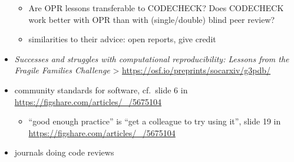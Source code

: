 \documentclass[12pt]{article}
\begin{document}
\begin{itemize}
  \begin{itemize}
  \item
    Are OPR lessons transferable to CODECHECK? Does CODECHECK work
    better with OPR than with (single/double) blind peer review?
  \item
    similarities to their advice: open reports, give credit
  \end{itemize}
\item
  \emph{Successes and struggles with computational reproducibility:
  Lessons from the Fragile Families Challenge} \textgreater{}
  \url{https://osf.io/preprints/socarxiv/g3pdb/}
\item
  community standards for software, cf.~slide 6 in
  \url{https://figshare.com/articles/_/5675104}

  \begin{itemize}
  \item
    ``good enough practice'' is ``get a colleague to try using it'',
    slide 19 in \url{https://figshare.com/articles/_/5675104}
  \end{itemize}
\item
  journals doing code reviews


\end{itemize}
\end{document}
